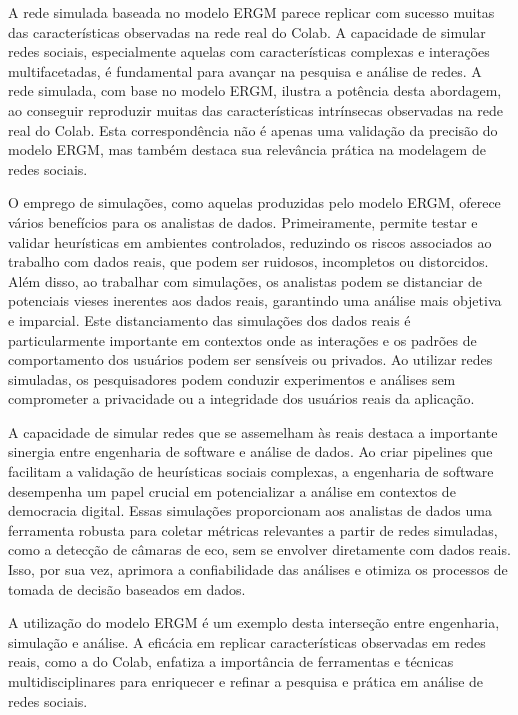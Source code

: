 A rede simulada baseada no modelo ERGM parece replicar com sucesso muitas das características observadas na rede real do Colab. A capacidade de simular redes sociais, especialmente aquelas com características complexas e interações multifacetadas, é fundamental para avançar na pesquisa e análise de redes. A rede simulada, com base no modelo ERGM, ilustra a potência desta abordagem, ao conseguir reproduzir muitas das características intrínsecas observadas na rede real do Colab. Esta correspondência não é apenas uma validação da precisão do modelo ERGM, mas também destaca sua relevância prática na modelagem de redes sociais.

O emprego de simulações, como aquelas produzidas pelo modelo ERGM, oferece vários benefícios para os analistas de dados. Primeiramente, permite testar e validar heurísticas em ambientes controlados, reduzindo os riscos associados ao trabalho com dados reais, que podem ser ruidosos, incompletos ou distorcidos. Além disso, ao trabalhar com simulações, os analistas podem se distanciar de potenciais vieses inerentes aos dados reais, garantindo uma análise mais objetiva e imparcial. Este distanciamento das simulações dos dados reais é particularmente importante em contextos onde as interações e os padrões de comportamento dos usuários podem ser sensíveis ou privados. Ao utilizar redes simuladas, os pesquisadores podem conduzir experimentos e análises sem comprometer a privacidade ou a integridade dos usuários reais da aplicação.

A capacidade de simular redes que se assemelham às reais destaca a importante sinergia entre engenharia de software e análise de dados. Ao criar pipelines que facilitam a validação de heurísticas sociais complexas, a engenharia de software desempenha um papel crucial em potencializar a análise em contextos de democracia digital. Essas simulações proporcionam aos analistas de dados uma ferramenta robusta para coletar métricas relevantes a partir de redes simuladas, como a detecção de câmaras de eco, sem se envolver diretamente com dados reais. Isso, por sua vez, aprimora a confiabilidade das análises e otimiza os processos de tomada de decisão baseados em dados.

A utilização do modelo ERGM é um exemplo desta interseção entre engenharia, simulação e análise. A eficácia em replicar características observadas em redes reais, como a do Colab, enfatiza a importância de ferramentas e técnicas multidisciplinares para enriquecer e refinar a pesquisa e prática em análise de redes sociais.

